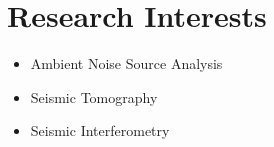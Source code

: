 \section*{Research Interests}

\begin{itemize}
\item Ambient Noise Source Analysis
\item Seismic Tomography 
\item Seismic Interferometry
\end{itemize}

